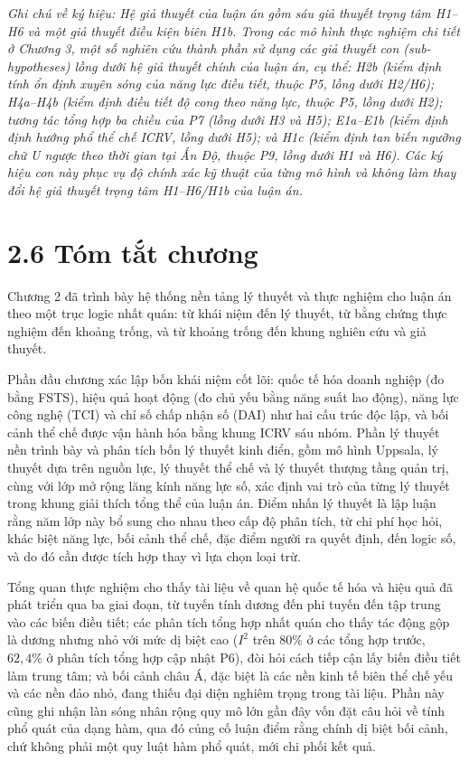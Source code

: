 \documentclass[
  a4paper,
  13pt]{extreport}
\begin{document}
\emph{Ghi chú về ký hiệu: Hệ giả thuyết của luận án gồm sáu giả thuyết
trọng tâm H1--H6 và một giả thuyết điều kiện biên H1b. Trong các mô hình
thực nghiệm chi tiết ở Chương 3, một số nghiên cứu thành phần sử dụng
các giả thuyết con (sub-hypotheses) lồng dưới hệ giả thuyết chính của
luận án, cụ thể: H2b (kiểm định tính ổn định xuyên sóng của năng lực
điều tiết, thuộc P5, lồng dưới H2/H6); H4a--H4b (kiểm định điều tiết độ
cong theo năng lực, thuộc P5, lồng dưới H2); tương tác tổng hợp ba chiều
của P7 (lồng dưới H3 và H5); E1a--E1b (kiểm định định hướng phổ thể chế
ICRV, lồng dưới H5); và H1c (kiểm định tan biến ngưỡng chữ U ngược theo
thời gian tại Ấn Độ, thuộc P9, lồng dưới H1 và H6). Các ký hiệu con này
phục vụ độ chính xác kỹ thuật của từng mô hình và không làm thay đổi hệ
giả thuyết trọng tâm H1--H6/H1b của luận án.}

\hypertarget{tuxf3m-tux1eaft-chux1b0ux1a1ng}{%
\section{2.6 Tóm tắt chương}\label{tuxf3m-tux1eaft-chux1b0ux1a1ng}}

Chương 2 đã trình bày hệ thống nền tảng lý thuyết và thực nghiệm cho
luận án theo một trục logic nhất quán: từ khái niệm đến lý thuyết, từ
bằng chứng thực nghiệm đến khoảng trống, và từ khoảng trống đến khung
nghiên cứu và giả thuyết.

Phần đầu chương xác lập bốn khái niệm cốt lõi: quốc tế hóa doanh nghiệp
(đo bằng FSTS), hiệu quả hoạt động (đo chủ yếu bằng năng suất lao động),
năng lực công nghệ (TCI) và chỉ số chấp nhận số (DAI) như hai cấu trúc
độc lập, và bối cảnh thể chế được vận hành hóa bằng khung ICRV sáu nhóm.
Phần lý thuyết nền trình bày và phân tích bốn lý thuyết kinh điển, gồm
mô hình Uppsala, lý thuyết dựa trên nguồn lực, lý thuyết thể chế và lý
thuyết thượng tầng quản trị, cùng với lớp mở rộng lăng kính năng lực số,
xác định vai trò của từng lý thuyết trong khung giải thích tổng thể của
luận án. Điểm nhấn lý thuyết là lập luận rằng năm lớp này bổ sung cho
nhau theo cấp độ phân tích, từ chi phí học hỏi, khác biệt năng lực, bối
cảnh thể chế, đặc điểm người ra quyết định, đến logic số, và do đó cần
được tích hợp thay vì lựa chọn loại trừ.

Tổng quan thực nghiệm cho thấy tài liệu về quan hệ quốc tế hóa và hiệu
quả đã phát triển qua ba giai đoạn, từ tuyến tính dương đến phi tuyến
đến tập trung vào các biến điều tiết; các phân tích tổng hợp nhất quán
cho thấy tác động gộp là dương nhưng nhỏ với mức dị biệt cao (\(I^2\)
trên 80\% ở các tổng hợp trước, \(62{,}4\%\) ở phân tích tổng hợp cập
nhật P6), đòi hỏi cách tiếp cận lấy biến điều tiết làm trung tâm; và bối
cảnh châu Á, đặc biệt là các nền kinh tế biên thể chế yếu và các nền đảo
nhỏ, đang thiếu đại diện nghiêm trọng trong tài liệu. Phần này cũng ghi
nhận làn sóng nhân rộng quy mô lớn gần đây vốn đặt câu hỏi về tính phổ
quát của dạng hàm, qua đó củng cố luận điểm rằng chính dị biệt bối cảnh,
chứ không phải một quy luật hàm phổ quát, mới chi phối kết quả.
\end{document}
